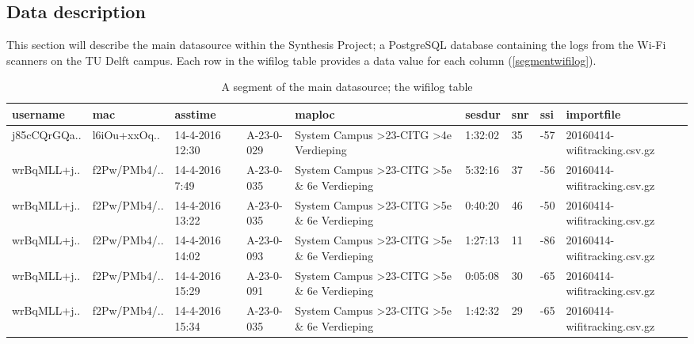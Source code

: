 \subsection{Data description}\label{datadescription}
This section will describe the main datasource within the Synthesis Project; a PostgreSQL database containing the logs from the Wi-Fi scanners on the TU Delft campus. Each row in the wifilog table provides a data value for each column (\autoref{segmentwifilog}).


\begin{table}[H]
	\centering
	\captionsetup{justification=centering}
	\caption{A segment of the main datasource; the wifilog table}
	\label{segmentwifilog}
	\begin{tabular}{@{}lllllllll@{}}
		\toprule
		\textbf{username} & \textbf{mac} & \textbf{asstime} & \textbf{}  & \textbf{maploc}                                                     & \textbf{sesdur} & \textbf{snr} & \textbf{ssi} & \textbf{importfile}          \\ \midrule
		j85cCQrGQa..      & l6iOu+xxOq.. & 14-4-2016 12:30  & A-23-0-029 & System Campus \textgreater 23-CITG \textgreater 4e Verdieping       & 1:32:02         & 35           & -57          & 20160414-wifitracking.csv.gz \\
		wrBqMLL+j..       & f2Pw/PMb4/.. & 14-4-2016 7:49   & A-23-0-035 & System Campus \textgreater 23-CITG \textgreater 5e \& 6e Verdieping & 5:32:16         & 37           & -56          & 20160414-wifitracking.csv.gz \\
		wrBqMLL+j..       & f2Pw/PMb4/.. & 14-4-2016 13:22  & A-23-0-035 & System Campus \textgreater 23-CITG \textgreater 5e \& 6e Verdieping & 0:40:20         & 46           & -50          & 20160414-wifitracking.csv.gz \\
		wrBqMLL+j..       & f2Pw/PMb4/.. & 14-4-2016 14:02  & A-23-0-093 & System Campus \textgreater 23-CITG \textgreater 5e \& 6e Verdieping & 1:27:13         & 11           & -86          & 20160414-wifitracking.csv.gz \\
		wrBqMLL+j..       & f2Pw/PMb4/.. & 14-4-2016 15:29  & A-23-0-091 & System Campus \textgreater 23-CITG \textgreater 5e \& 6e Verdieping & 0:05:08         & 30           & -65          & 20160414-wifitracking.csv.gz \\
		wrBqMLL+j..       & f2Pw/PMb4/.. & 14-4-2016 15:34  & A-23-0-035 & System Campus \textgreater 23-CITG \textgreater 5e \& 6e Verdieping & 1:42:32         & 29           & -65          & 20160414-wifitracking.csv.gz \\

\end{tabular}
\end{table}
